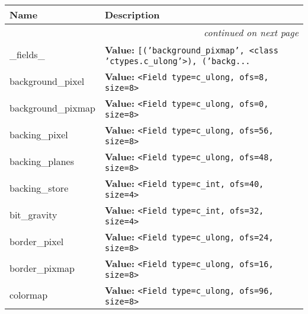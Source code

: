     \vspace{-1cm}
\hspace{\varindent}\begin{longtable}{|p{\varnamewidth}|p{\vardescrwidth}|l}
\cline{1-2}
\cline{1-2} \centering \textbf{Name} & \centering \textbf{Description}& \\
\cline{1-2}
\endhead\cline{1-2}\multicolumn{3}{r}{\small\textit{continued on next page}}\\\endfoot\cline{1-2}
\endlastfoot\raggedright \_\-f\-i\-e\-l\-d\-s\-\_\- & \raggedright \textbf{Value:} 
{\tt \texttt{[}\texttt{(}\texttt{'}\texttt{background\_pixmap}\texttt{'}\texttt{, }{\textless}class 'ctypes.c\_ulong'{\textgreater}\texttt{)}\texttt{, }\texttt{(}\texttt{'}\texttt{backg}\texttt{...}}&\\
\cline{1-2}
\raggedright b\-a\-c\-k\-g\-r\-o\-u\-n\-d\-\_\-p\-i\-x\-e\-l\- & \raggedright \textbf{Value:} 
{\tt {\textless}Field type=c\_ulong, ofs=8, size=8{\textgreater}}&\\
\cline{1-2}
\raggedright b\-a\-c\-k\-g\-r\-o\-u\-n\-d\-\_\-p\-i\-x\-m\-a\-p\- & \raggedright \textbf{Value:} 
{\tt {\textless}Field type=c\_ulong, ofs=0, size=8{\textgreater}}&\\
\cline{1-2}
\raggedright b\-a\-c\-k\-i\-n\-g\-\_\-p\-i\-x\-e\-l\- & \raggedright \textbf{Value:} 
{\tt {\textless}Field type=c\_ulong, ofs=56, size=8{\textgreater}}&\\
\cline{1-2}
\raggedright b\-a\-c\-k\-i\-n\-g\-\_\-p\-l\-a\-n\-e\-s\- & \raggedright \textbf{Value:} 
{\tt {\textless}Field type=c\_ulong, ofs=48, size=8{\textgreater}}&\\
\cline{1-2}
\raggedright b\-a\-c\-k\-i\-n\-g\-\_\-s\-t\-o\-r\-e\- & \raggedright \textbf{Value:} 
{\tt {\textless}Field type=c\_int, ofs=40, size=4{\textgreater}}&\\
\cline{1-2}
\raggedright b\-i\-t\-\_\-g\-r\-a\-v\-i\-t\-y\- & \raggedright \textbf{Value:} 
{\tt {\textless}Field type=c\_int, ofs=32, size=4{\textgreater}}&\\
\cline{1-2}
\raggedright b\-o\-r\-d\-e\-r\-\_\-p\-i\-x\-e\-l\- & \raggedright \textbf{Value:} 
{\tt {\textless}Field type=c\_ulong, ofs=24, size=8{\textgreater}}&\\
\cline{1-2}
\raggedright b\-o\-r\-d\-e\-r\-\_\-p\-i\-x\-m\-a\-p\- & \raggedright \textbf{Value:} 
{\tt {\textless}Field type=c\_ulong, ofs=16, size=8{\textgreater}}&\\
\cline{1-2}
\raggedright c\-o\-l\-o\-r\-m\-a\-p\- & \raggedright \textbf{Value:} 
{\tt {\textless}Field type=c\_ulong, ofs=96, size=8{\textgreater}}&\\

\end{longtable}
